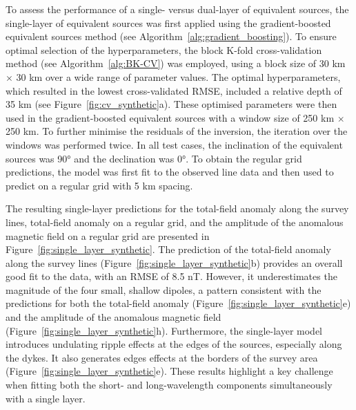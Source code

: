 To assess the performance of a single- versus dual-layer of equivalent sources, the single-layer of equivalent sources was first applied using the gradient-boosted equivalent sources method (see Algorithm~\ref{alg:gradient_boosting}). To ensure optimal selection of the hyperparameters, the block K-fold cross-validation method (see Algorithm~\ref{alg:BK-CV}) was employed, using a block size of 30 km $\times$ 30 km over a wide range of parameter values. The optimal hyperparameters, which resulted in the lowest cross-validated RMSE, included a relative depth of 35 km (see Figure~\ref{fig:cv_synthetic}a). These optimised parameters were then used in the gradient-boosted equivalent sources with a window size of 250 km $\times$ 250 km. To further minimise the residuals of the inversion, the iteration over the windows was performed twice. In all test cases, the inclination of the equivalent sources was \ang{90} and the declination was \ang{0}. To obtain the regular grid predictions, the model was first fit to the observed line data and then used to predict on a regular grid with 5 km spacing.

The resulting single-layer predictions for the total-field anomaly along the survey lines, total-field anomaly on a regular grid, and the amplitude of the anomalous magnetic field on a regular grid are presented in Figure~\ref{fig:single_layer_synthetic}. The prediction of the total-field anomaly along the survey lines (Figure~\ref{fig:single_layer_synthetic}b) provides an overall good fit to the data, with an RMSE of 8.5 nT. However, it underestimates the magnitude of the four small, shallow dipoles, a pattern consistent with the predictions for both the total-field anomaly (Figure~\ref{fig:single_layer_synthetic}e) and the amplitude of the anomalous magnetic field (Figure~\ref{fig:single_layer_synthetic}h). Furthermore, the single-layer model introduces undulating ripple effects at the edges of the sources, especially along the dykes. It also generates edges effects at the borders of the survey area (Figure~\ref{fig:single_layer_synthetic}e). These results highlight a key challenge when fitting both the short- and long-wavelength components simultaneously with a single layer.

